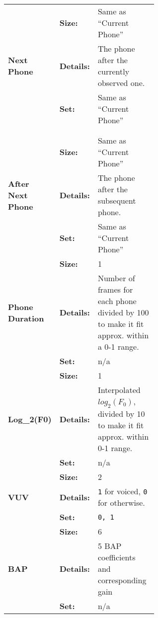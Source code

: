 \begin{longtable}[c]{llp{0.6\linewidth}}
\multirow{3}{0.18\linewidth}{{\bf Next Phone}}
          & {\bf Size:} 
                                & Same as ``Current Phone'' \\
          & {\bf Details:} 
                                & The phone after the currently observed one. \\
          & {\bf Set:} 
                                & Same as ``Current Phone'' \\
          \midrule
&& \\
&& \\
\midrule
\multirow{3}{0.18\linewidth}{{\bf After Next Phone}}
          & {\bf Size:} 
                                & Same as ``Current Phone'' \\
          & {\bf Details:} 
                                & The phone after the subsequent phone. \\
          & {\bf Set:} 
                                & Same as ``Current Phone'' \\
          \midrule


\multirow{3}{0.18\linewidth}{{\bf Phone Duration}}
          & {\bf Size:} 
                                & 1 \\
          & {\bf Details:} 
                                & Number of frames for each phone divided by 100 to make it fit approx. within a 0-1 range.\\ 
          & {\bf Set:} 
                                & n/a\\ 
          \midrule


\multirow{3}{0.18\linewidth}{{\bf Log_2(\ac{F0})}}
          & {\bf Size:} 
                                & 1 \\
          & {\bf Details:} 
                                & Interpolated $log_2(F_0)$, divided by 10 to make it fit approx. within 0-1 range.\\ 
          & {\bf Set:} 
                                & n/a\\ 
          \midrule


\multirow{3}{0.18\linewidth}{{\bf \ac{VUV}}}
          & {\bf Size:} 
                                & 2 \\
          & {\bf Details:} 
                                & \verb|1| for voiced, \verb|0| for otherwise.\\
          & {\bf Set:} 
                                &  \verb|0, 1|\\ 
          \midrule


\multirow{3}{0.18\linewidth}{{\bf \ac{BAP}}}
          & {\bf Size:} 
                                & 6 \\
          & {\bf Details:} 
                                & 5 \ac{BAP} coefficients and corresponding gain\\
          & {\bf Set:} 
                                &  n/a\\
          \midrule




\end{longtable}
